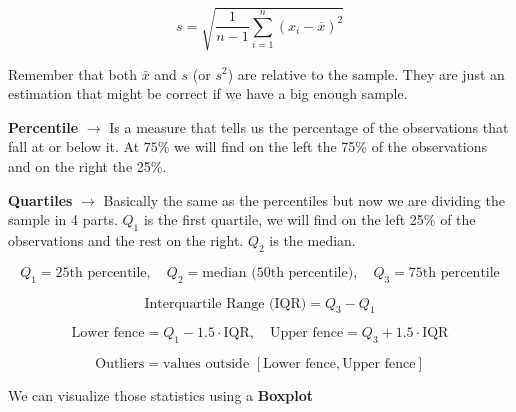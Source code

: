 \[
s = \sqrt{\frac{1}{n-1} \sum_{i=1}^n (x_i - \overline{x})^2}
\]

Remember that both $\bar{x}$ and $s$ (or $s^2$) are relative to the sample. They are just an estimation that might be correct if we have a big enough sample.

\vspace{10pt}

\textbf{Percentile} $\xrightarrow{}$ Is a measure that tells us the percentage of the observations that fall at or below it. At $75\%$ we will find on the left the 75\% of the observations and on the right the 25\%.

\vspace{10pt}


\textbf{Quartiles} $\xrightarrow{}$ Basically the same as the percentiles but now we are dividing the sample in 4 parts. $Q_1$ is the first quartile, we will find on the left 25\% of the observations and the rest on the right. $Q_2$ is the median.

\[
Q_1 = \text{25th percentile}, \quad
Q_2 = \text{median (50th percentile)}, \quad
Q_3 = \text{75th percentile}
\]

\[
\text{Interquartile Range (IQR)} = Q_3 - Q_1
\]

\[
\text{Lower fence} = Q_1 - 1.5 \cdot \text{IQR}, \quad
\text{Upper fence} = Q_3 + 1.5 \cdot \text{IQR}
\]

\[
\text{Outliers} = \text{values outside } [\text{Lower fence}, \text{Upper fence}]
\]

\vspace{10pt}

We can visualize those statistics using a \textbf{Boxplot}




